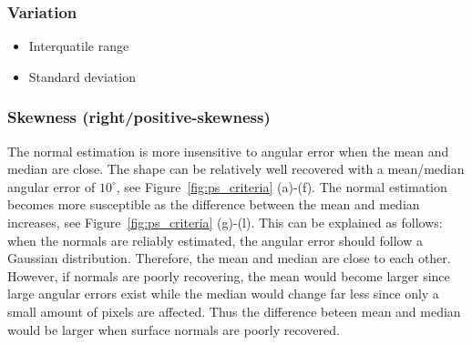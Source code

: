 \subsubsection{Variation}
\begin{itemize}
  \item Interquatile range %
  \item Standard deviation %
\end{itemize}
  
\subsubsection{Skewness (right/positive-skewness)}
The normal estimation is more insensitive to angular error when the mean and median are close. The shape can be relatively well recovered with a mean/median angular error of $10^\circ$, see Figure~\ref{fig:ps_criteria} (a)-(f). The normal estimation becomes more susceptible as the difference between the mean and median increases, see Figure~\ref{fig:ps_criteria} (g)-(l). This can be explained as follows: when the normals are reliably estimated, the angular error should follow a Gaussian distribution. Therefore, the mean and median are close to each other. However, if normals are poorly recovering, the mean would become larger since large angular errors exist while the median would change far less since only a small amount of pixels are affected. Thus the difference beteen mean and median would be larger when surface normals are poorly recovered.

